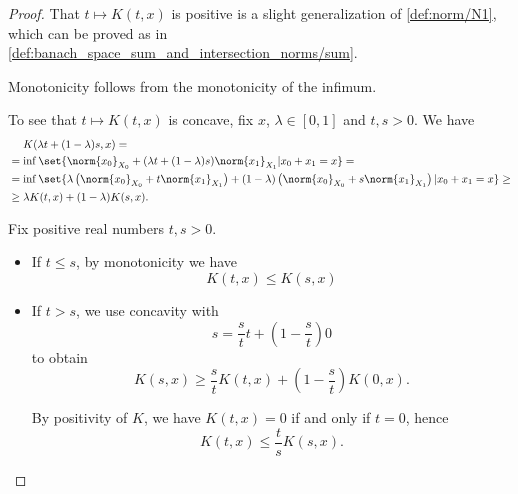 \begin{proof}
   That \( t \mapsto K(t, x) \) is positive is a slight generalization of \cref{def:norm/N1}, which can be proved as in \cref{def:banach_space_sum_and_intersection_norms/sum}.

  Monotonicity follows from the monotonicity of the infimum.

  To see that \( t \mapsto K(t, x) \) is concave, fix \( x \), \( \lambda \in [0, 1] \) and \( t, s > 0 \). We have
  \begin{align*}
    &\phantom{{}={}}
    K(\lambda t + (1 - \lambda) s, x)
    = \\ &=
    \inf \set{ \norm{x_0}_{X_0} + (\lambda t + (1 - \lambda) s)\norm{x_1}_{X_1} | x_0 + x_1 = x }
    = \\ &=
    \inf \set{ \lambda \left(\norm{x_0}_{X_0} + t \norm{x_1}_{X_1} \right) + (1 - \lambda) \left(\norm{x_0}_{X_0} + s \norm{x_1}_{X_1} \right) | x_0 + x_1 = x }
    \geq \\ &\geq
    \lambda K(t, x) + (1 - \lambda) K(s, x).
  \end{align*}

   Fix positive real numbers \( t, s > 0 \).
  \begin{itemize}
    \item If \( t \leq s \), by monotonicity we have
    \begin{equation}\label{eq:def:k_functional_properties/inequality/monotonicity}
      K(t, x) \leq K(s, x)
    \end{equation}

    \item If \( t > s \), we use concavity with
    \begin{equation*}
      s = \frac s t t + \left(1 - \frac s t \right) 0
    \end{equation*}
    to obtain
    \begin{equation*}
      K(s, x) \geq \frac s t K(t, x) + \left(1 - \frac s t \right) K(0, x).
    \end{equation*}

    By positivity of \( K \), we have \( K(t, x) = 0 \) if and only if \( t = 0 \), hence
    \begin{equation}\label{eq:def:k_functional_properties/inequality/concavity}
      K(t, x) \leq \frac t s K(s, x).
    \end{equation}
  \end{itemize}


\end{proof}
